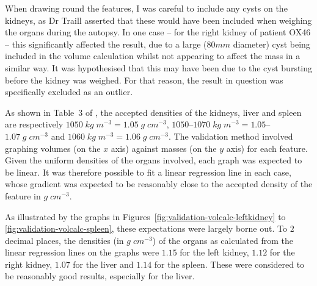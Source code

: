 When drawing round the features, I was careful to include any cysts on the kidneys, as Dr Traill asserted that these would have been included when weighing the organs during the autopsy. In one case -- for the right kidney of patient OX46 -- this significantly affected the result, due to a large ($80\mathit{mm}$ diameter) cyst being included in the volume calculation whilst not appearing to affect the mass in a similar way. It was hypothesised that this may have been due to the cyst bursting before the kidney was weighed. For that reason, the result in question was specifically excluded as an outlier.

As shown in Table~$3$ of \cite{woodard86}, the accepted densities of the kidneys, liver and spleen are respectively $1050 \; \mathit{kg} \; m^{-3} = 1.05 \; g \; \mathit{cm}^{-3}$, $1050$--$1070 \; \mathit{kg} \; m^{-3} = 1.05$--$1.07 \; g \; \mathit{cm}^{-3}$ and $1060 \; \mathit{kg} \; m^{-3} = 1.06 \; g \; \mathit{cm}^{-3}$. The validation method involved graphing volumes (on the $x$ axis) against masses (on the $y$ axis) for each feature. Given the uniform densities of the organs involved, each graph was expected to be linear. It was therefore possible to fit a linear regression line in each case, whose gradient was expected to be reasonably close to the accepted density of the feature in $g \; \mathit{cm}^{-3}$.

As illustrated by the graphs in Figures~\ref{fig:validation-volcalc-leftkidney} to \ref{fig:validation-volcalc-spleen}, these expectations were largely borne out. To $2$ decimal places, the densities (in $g \; \mathit{cm}^{-3}$) of the organs as calculated from the linear regression lines on the graphs were $1.15$ for the left kidney, $1.12$ for the right kidney, $1.07$ for the liver and $1.14$ for the spleen. These were considered to be reasonably good results, especially for the liver.

